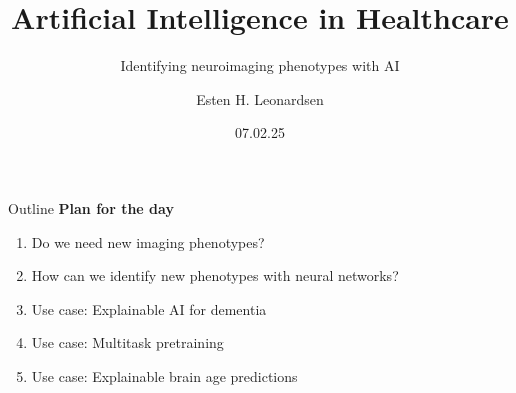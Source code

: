 \documentclass[10pt]{beamer}
\title{Artificial Intelligence in Healthcare}
\subtitle{Identifying neuroimaging phenotypes with AI}
\author{Esten H. Leonardsen}
\date{07.02.25}
\begin{document}
	\begin{frame}
	 	\maketitle
	\end{frame}

    \begin{frame}{Outline}
        \textbf{Plan for the day}
        \begin{enumerate}
            \item Do we need new imaging phenotypes?
            \item How can we identify new phenotypes with neural networks?
            \item Use case: Explainable AI for dementia
            \item Use case: Multitask pretraining
            \item Use case: Explainable brain age predictions
        \end{enumerate}
    \end{frame}

    
    
    
    
\end{document}
